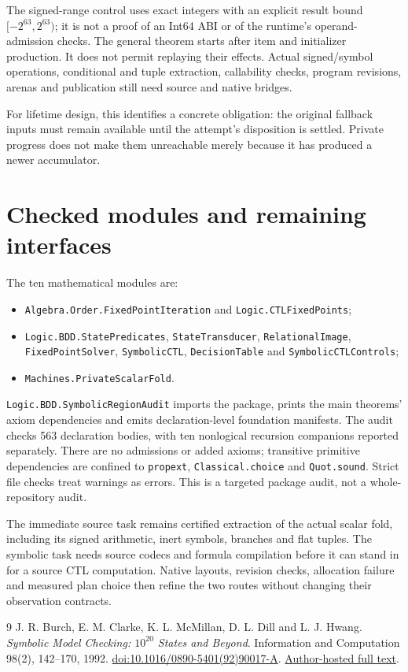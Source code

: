\documentclass[11pt,a4paper]{article}
\newcommand{\code}[1]{\nolinkurl{#1}}
\begin{document}
The signed-range control uses exact integers with an explicit result bound
$[-2^{63},2^{63})$; it is not a proof of an Int64 ABI or of the runtime's
operand-admission checks. The general theorem starts after item and initializer
production. It does not permit replaying their effects. Actual signed/symbol
operations, conditional and tuple extraction, callability checks, program
revisions, arenas and publication still need source and native bridges.

For lifetime design, this identifies a concrete obligation: the original
fallback inputs must remain available until the attempt's disposition is
settled. Private progress does not make them unreachable merely because it
has produced a newer accumulator.

\section{Checked modules and remaining interfaces}

The ten mathematical modules are:
\begin{itemize}
\item \code{Algebra.Order.FixedPointIteration} and \code{Logic.CTLFixedPoints};
\item \code{Logic.BDD.StatePredicates}, \code{StateTransducer},
  \code{RelationalImage}, \code{FixedPointSolver}, \code{SymbolicCTL},
  \code{DecisionTable} and \code{SymbolicCTLControls};
\item \code{Machines.PrivateScalarFold}.
\end{itemize}
\code{Logic.BDD.SymbolicRegionAudit} imports the package, prints the main
theorems' axiom dependencies and emits declaration-level foundation manifests.
The audit checks 563 declaration bodies, with ten nonlogical recursion
companions reported separately. There are no admissions or added axioms; transitive
primitive dependencies are confined to \code{propext},
\code{Classical.choice} and \code{Quot.sound}. Strict file checks treat warnings
as errors. This is a targeted package audit, not a whole-repository audit.

The immediate source task remains certified extraction of the actual scalar
fold, including its signed arithmetic, inert symbols, branches and flat
tuples. The symbolic task needs source codecs and formula compilation before
it can stand in for a source CTL computation. Native layouts, revision checks,
allocation failure and measured plan choice then refine the two routes
without changing their observation contracts.

\begin{thebibliography}{9}
J. R. Burch, E. M. Clarke, K. L. McMillan, D. L. Dill and L. J. Hwang.
\emph{Symbolic Model Checking: $10^{20}$ States and Beyond}.
Information and Computation 98(2), 142--170, 1992.
\href{https://doi.org/10.1016/0890-5401(92)90017-A}{doi:10.1016/0890-5401(92)90017-A}.
\href{https://mcmil.net/pubs/IC92.pdf}{Author-hosted full text}.
\end{thebibliography}
\end{document}
